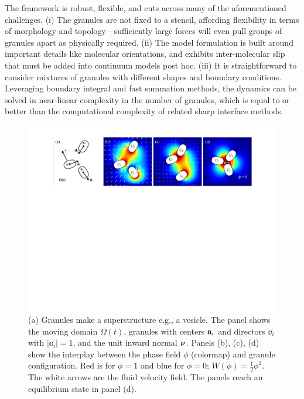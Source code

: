 The framework is robust, flexible, and cuts across many of the
aforementioned challenges. (i) The granules are not fixed to a stencil,
affording flexibility in terms of morphology and topology---sufficiently
large forces will even pull groups of granules apart as physically
required. (ii) The model formulation is built around important details
like molecular orientations, and exhibits inter-molecular slip that must
be added into continuum models post hoc. (iii) It is
straightforward to consider mixtures of granules with different shapes
and boundary conditions. Leveraging boundary integral and fast summation
methods, the dynamics can be solved in near-linear complexity in the
number of granules, which is equal to or better than the computational
complexity of related sharp interface methods. 

\begin{figure}
  \begin{center}
    \includegraphics[width=\textwidth]{figures/Background/Domain.pdf}
  \end{center}
  \caption{\label{fig:flow_map} \footnotesize (a) Granules make a
  superstructure e.g., a vesicle. The panel shows the moving domain
  $\Omega(t)$, granules with centers $\aa_i$ and directors $\dd_i$ with
  $|\dd_i| = 1$, and the unit inward normal $\nnu$. Panels (b), (c), (d)
  show the interplay between the phase field $\phi$ (colormap) and
  granule configuration. Red is for $\phi = 1$ and blue for $\phi = 0$;
  $W(\phi) = \tfrac{1}{2}\phi^2$. The white arrows are the fluid
  velocity field. The panels reach an equilibrium state in panel (d).}
\end{figure}


